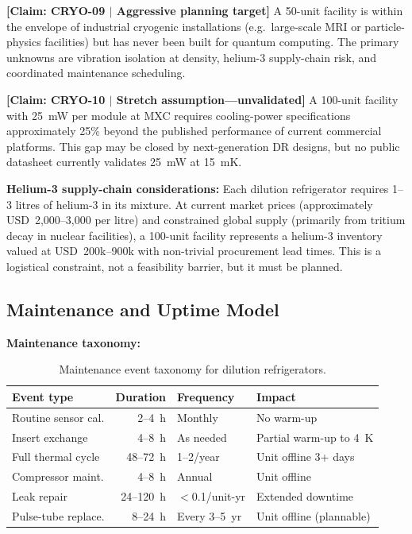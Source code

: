 \documentclass[conference]{IEEEtran}
\begin{document}
\textbf{[Claim: CRYO-09 $|$ Aggressive planning target]} A 50-unit facility is within the envelope of industrial cryogenic installations (e.g.\ large-scale MRI or particle-physics facilities) but has never been built for quantum computing. The primary unknowns are vibration isolation at density, helium-3 supply-chain risk, and coordinated maintenance scheduling.

\textbf{[Claim: CRYO-10 $|$ Stretch assumption---unvalidated]} A 100-unit facility with 25~mW per module at MXC requires cooling-power specifications approximately 25\% beyond the published performance of current commercial platforms. This gap may be closed by next-generation DR designs, but no public datasheet currently validates 25~mW at 15~mK.

\textbf{Helium-3 supply-chain considerations:} Each dilution refrigerator requires 1--3 litres of helium-3 in its mixture. At current market prices (approximately USD~2,000--3,000 per litre) and constrained global supply (primarily from tritium decay in nuclear facilities), a 100-unit facility represents a helium-3 inventory valued at USD~200k--900k with non-trivial procurement lead times. This is a logistical constraint, not a feasibility barrier, but it must be planned.

\subsection{Maintenance and Uptime Model}

\textbf{Maintenance taxonomy:}

\begin{table}[H]
\centering
\caption{Maintenance event taxonomy for dilution refrigerators.}
\label{tab:maintenance}
\footnotesize
\begin{tabularx}{\columnwidth}{L{1.8cm}rL{1.5cm}L{1.8cm}}
\toprule
\textbf{Event type} & \textbf{Duration} & \textbf{Frequency} & \textbf{Impact} \\
\midrule
Routine sensor cal. & 2--4~h & Monthly & No warm-up \\
Insert exchange & 4--8~h & As needed & Partial warm-up to 4~K \\
Full thermal cycle & 48--72~h & 1--2/year & Unit offline 3+ days \\
Compressor maint. & 4--8~h & Annual & Unit offline \\
Leak repair & 24--120~h & $<$0.1/unit-yr & Extended downtime \\
Pulse-tube replace. & 8--24~h & Every 3--5~yr & Unit offline (plannable) \\
\bottomrule
\end{tabularx}
\end{table}
\end{document}
